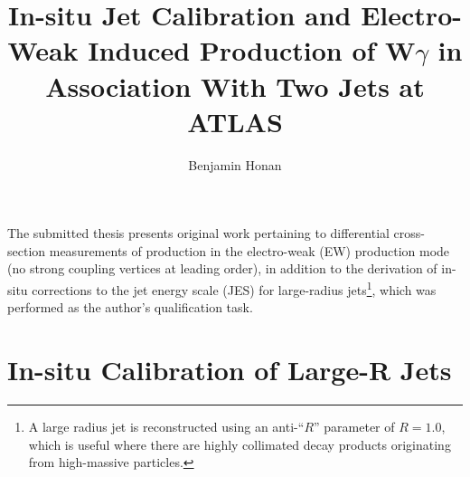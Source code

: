 \documentclass{thesissummary}
\begin{document}
\title{In-situ Jet Calibration and Electro-Weak Induced Production of W$\gamma$ in Association With Two Jets at ATLAS}

\author{ Benjamin Honan }

\address{School of Physics and Astronomy, University of Manchester, M13 9PL, United Kingdom}
\maketitle
\strut\newline
\noindent
The submitted thesis presents original work pertaining to differential cross-section measurements of \wyjj production in the electro-weak (EW) production mode (no strong coupling vertices at leading order), in addition to the derivation of in-situ corrections to the jet energy scale (JES) for large-radius jets\footnote{A large radius jet is reconstructed using an anti-\kt ``$R$'' parameter of $R=1.0$, which is useful where there are highly collimated decay products originating from high-\pt massive particles.}, which was performed as the author's qualification task.

\section{In-situ Calibration of Large-R Jets}
\end{document}
